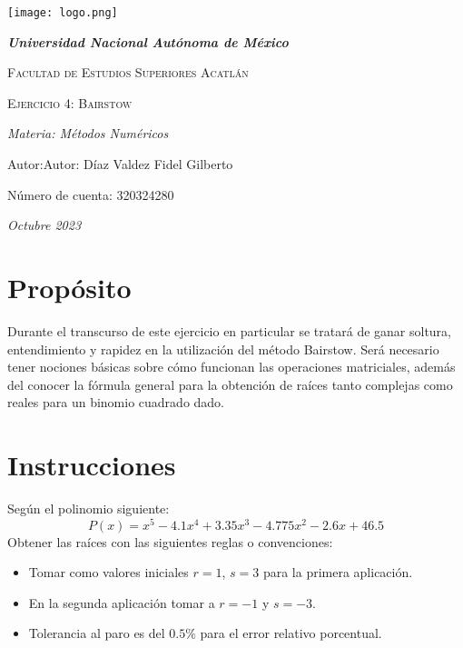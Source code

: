 \documentclass{article}
\begin{document}
   \begin{titlepage}
       \centering
       {\texttt{[image: logo.png]} \par}
       {\bfseries\LARGE\textit{Universidad Nacional Autónoma de México}\par}
       \vspace{1cm}


       {\scshape\Large Facultad de Estudios Superiores Acatlán \par}
       \vspace{3cm}
      
       {\scshape\Huge Ejercicio 4: Bairstow \par}
       \vspace{3cm}


       {\slshape\Large Materia: Métodos Numéricos \par}
       \vfill


       {\Large Autor:Autor: Díaz Valdez Fidel Gilberto \par}
       {\Large Número de cuenta: 320324280 \par}
       \vfill


       {\slshape Octubre 2023\par}




   \end{titlepage}


\section{Propósito}
Durante el transcurso de este ejercicio en particular se tratará de ganar soltura,
entendimiento y rapidez en la utilización del método Bairstow. Será necesario tener
nociones básicas sobre cómo funcionan las operaciones matriciales, además del
conocer la fórmula general para la obtención de raíces tanto complejas como reales
para un binomio cuadrado dado.


\section{Instrucciones}
Según el polinomio siguiente: $$P(x) = x^5 -4.1x^4 + 3.35x^3 -4.775x^2 -2.6x +46.5$$
Obtener las raíces con las siguientes reglas o convenciones:
\begin{itemize}
   \item Tomar como valores iniciales $r = 1$, $s = 3$ para la primera aplicación.
   \item En la segunda aplicación tomar a $r = -1 $ y $s = -3$.
   \item Tolerancia al paro es del $0.5\%$ para el error relativo porcentual.
\end{itemize}
\end{document}
